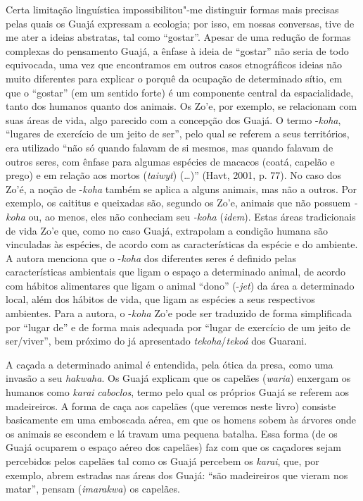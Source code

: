 Certa limitação linguística impossibilitou"-me distinguir formas mais
precisas pelas quais os Guajá expressam a ecologia; por isso, em nossas
conversas, tive de me ater a ideias abstratas, tal como ``gostar''. Apesar
de uma redução de formas complexas do pensamento Guajá, a ênfase à ideia
de ``gostar'' não seria de todo equivocada, uma vez que encontramos em
outros casos etnográficos ideias não muito diferentes para explicar o
porquê da ocupação de determinado sítio, em que o ``gostar'' (em um
sentido forte) é um componente central da espacialidade, tanto dos
humanos quanto dos animais. Os Zo'e, por exemplo, se relacionam com suas
áreas de vida, algo parecido com a concepção dos Guajá. O termo
-\emph{koha}, ``lugares de exercício de um jeito de ser'', pelo qual se
referem a seus territórios, era utilizado ``não só quando falavam de si
mesmos, mas quando falavam de outros seres, com ênfase para algumas
espécies de macacos (coatá, capelão e prego) e em relação aos mortos
(\emph{taiwyt}) (\ldots{})'' (Havt, 2001, p. 77). No caso dos Zo'é, a noção de
-\emph{koha} também se aplica a alguns animais, mas não a outros. Por
exemplo, os caititus e queixadas são, segundo os Zo'e, animais que não
possuem \emph{-koha} ou, ao menos, eles não conheciam seu \emph{-koha}
(\emph{idem}). Estas áreas tradicionais de vida Zo'e que, como no caso Guajá,
extrapolam a condição humana são vinculadas às espécies, de acordo com
as características da espécie e do ambiente. A autora menciona que o
-\emph{koha} dos diferentes seres é definido pelas características
ambientais que ligam o espaço a determinado animal, de acordo com
hábitos alimentares que ligam o animal ``dono'' (-\emph{jet}) da área a
determinado local, além dos hábitos de vida, que ligam as espécies a
seus respectivos ambientes. Para a autora, o -\emph{koha} Zo'e pode ser
traduzido de forma simplificada por ``lugar de'' e de forma mais adequada
por ``lugar de exercício de um jeito de ser/viver'', bem próximo do já
apresentado \emph{tekoha}/\emph{tekoá} dos Guarani.

A caçada a determinado animal é entendida, pela ótica da presa, como uma
invasão a seu \emph{hakwaha}. Os Guajá explicam que os capelães
(\emph{waria}) enxergam os humanos como \emph{karai} \emph{caboclos},
termo pelo qual os próprios Guajá se referem aos madeireiros. A forma de
caça aos capelães (que veremos neste livro) consiste basicamente em uma
emboscada aérea, em que os homens sobem às árvores onde os animais se
escondem e lá travam uma pequena batalha. Essa forma (de os Guajá
ocuparem o espaço aéreo dos capelães) faz com que os caçadores sejam
percebidos pelos capelães tal como os Guajá percebem os \emph{karai},
que, por exemplo, abrem estradas nas áreas dos Guajá: ``são madeireiros
que vieram nos matar'', pensam (\emph{imarakwa}) os capelães.

